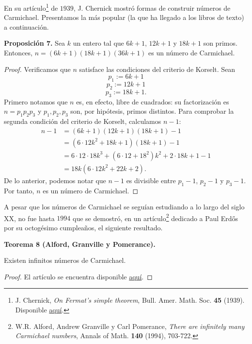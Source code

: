 \documentclass{article}
\theoremstyle{definition}
\begin{document}
En su artículo\footnote{J. Chernick, \textit{On Fermat’s simple theorem}, Bull. Amer. Math. Soc.  \textbf{45} (1939). Disponible \href{https://projecteuclid.org/download/pdf_1/euclid.bams/1183501763}{aquí}. } de $1939$, J. Chernick mostró formas de construir números de Carmichael. Presentamos la más popular (la que ha llegado a los libros de texto) a continuación. 
\vspace{0.3cm}
\begin{mybox2}
\textbf{Proposición 7. } Sea $k$ un entero tal que $6k + 1$, $12k + 1$ y $18k + 1$ son primos. Entonces, 
$n = (6k + 1)(18k+1)(36k + 1)$
es un número de Carmichael. 
\end{mybox2}		
\begin{proof}
	Verificamos que $n$ satisface las condiciones del criterio de Korselt. Sean 
	$$ p_{1} := 6k + 1 $$
	$$ p_{2} := 12k + 1 $$
	$$ p_{3} := 18k + 1 .$$
	Primero notamos que $n$ es, en efecto, libre de cuadrados: su factorización es $n = p_{1} p_{2} p_{3}$ y $p_{1}, p_{2}, p_{3}$ son, por hipótesis, primos distintos. Para comprobar la segunda condición del criterio de Korselt, calculamos $n - 1$:
\begin{equation*}
\begin{split}
n - 1 &= (6k + 1)(12k + 1)(18k + 1) - 1 \\
&= (6 \cdot 12 k^2 + 18k + 1)(18k + 1) - 1 \\
&= 6\cdot 12 \cdot 18 k^3 + (6 \cdot 12 + 18^2) k^2 + 2 \cdot 18 k + 1 - 1 \\
& = 18k(6 \cdot 12 k^2 + 22k + 2 ).
\end{split}
\end{equation*}
De lo anterior, podemos notar que $n - 1$ es divisible entre $p_{1} - 1$, $p_{2} - 1$ y $p_{3} - 1$. Por tanto, $n$ es un número de Carmichael. 
\end{proof}
\newpage

A pesar que los números de Carmichael se seguían estudiando a lo largo del siglo XX, no fue hasta $1994$ que se demostró, en un artículo\footnote{W.R. Alford, Andrew Granville y Carl Pomerance, \textit{There are infinitely many
		Carmichael numbers}, Annals of Math. \textbf{140} (1994), 703-722.} dedicado a Paul Erdős por su octogésimo cumpleaños, el siguiente resultado. 
\begin{mybox2}
	\textbf{Teorema 8 (Alford, Granville y Pomerance).} 
	\begin{center}Existen infinitos números de Carmichael. \end{center} 
\vspace{0.1cm}
\end{mybox2}	
\begin{proof}
El artículo se encuentra disponible  \href{https://dms.umontreal.ca/~andrew/PDF/carmichael.pdf}{aquí}.
\end{proof}
\end{document}
